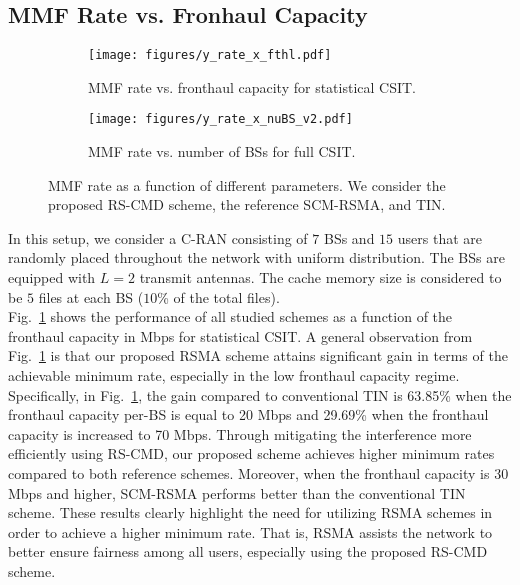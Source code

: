 \documentclass[12pt,draftcls,onecolumn]{IEEEtran}
\theoremstyle{remark}
\theoremstyle{definition}
\begin{document}
{\subsection{MMF Rate vs. Fronhaul Capacity}\label{mmrvfc}
\begin{figure}
	\centering
	\begin{subfigure}[t]{0.49\textwidth}
		\centering
		\texttt{[image: figures/y\_rate\_x\_fthl.pdf]}
		\caption{MMF rate vs. fronthaul capacity for statistical CSIT.}
		\label{y_rate_x_fthl_im}
	\end{subfigure}\hfill
	\begin{subfigure}[t]{0.49\textwidth}
		\centering
		\texttt{[image: figures/y\_rate\_x\_nuBS\_v2.pdf]}
		\caption{MMF rate vs. number of BSs for full CSIT.}
		\label{y_rate_x_nuBS_im}
	\end{subfigure}
	\caption{MMF rate as a function of different parameters. We consider the proposed RS-CMD scheme, the reference SCM-RSMA, and TIN.}
	\label{y_rate_x_diff_im}
\end{figure}
In this setup, we consider a C-RAN consisting of $7$ BSs and $15$ users that are randomly placed throughout the network with uniform distribution. The BSs are equipped with $L=2$ transmit antennas. The cache memory size is considered to be $5$ files at each BS ($10$\% of the total files). \\
\indent Fig.~\ref{y_rate_x_fthl_im} shows the performance of all studied schemes as a function of the fronthaul capacity in Mbps for statistical CSIT. 
A general observation from Fig.~\ref{y_rate_x_fthl_im} is that our proposed RSMA scheme attains significant gain in terms of the achievable minimum rate, especially in the low fronthaul capacity regime. Specifically, in Fig.~\ref{y_rate_x_fthl_im}, the gain compared to conventional TIN is 63.85\% when the fronthaul capacity per-BS is equal to 20 Mbps and 29.69\% when the fronthaul capacity is increased to 70 Mbps. Through mitigating the interference more efficiently using RS-CMD, our proposed scheme achieves higher minimum rates compared to both reference schemes. Moreover, when the fronthaul capacity is $30$ Mbps and higher, SCM-RSMA performs better than the conventional TIN scheme. These results clearly highlight the need for utilizing RSMA schemes in order to achieve a higher minimum rate. That is, RSMA assists the network to better ensure fairness among all users, especially using the proposed RS-CMD scheme. %
}
\end{document}
